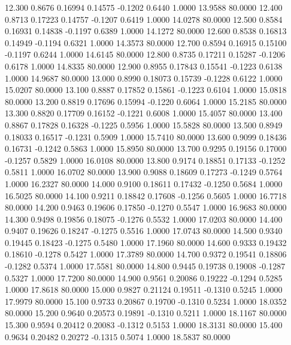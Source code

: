   12.300   0.8676   0.16994   0.14575  -0.1202   0.6440   1.0000  13.9588  80.0000
  12.400   0.8713   0.17223   0.14757  -0.1207   0.6419   1.0000  14.0278  80.0000
  12.500   0.8584   0.16931   0.14838  -0.1197   0.6389   1.0000  14.1272  80.0000
  12.600   0.8538   0.16813   0.14949  -0.1194   0.6321   1.0000  14.3573  80.0000
  12.700   0.8594   0.16915   0.15100  -0.1197   0.6244   1.0000  14.6145  80.0000
  12.800   0.8735   0.17211   0.15287  -0.1206   0.6178   1.0000  14.8335  80.0000
  12.900   0.8955   0.17843   0.15541  -0.1223   0.6138   1.0000  14.9687  80.0000
  13.000   0.8990   0.18073   0.15739  -0.1228   0.6122   1.0000  15.0207  80.0000
  13.100   0.8887   0.17852   0.15861  -0.1223   0.6104   1.0000  15.0818  80.0000
  13.200   0.8819   0.17696   0.15994  -0.1220   0.6064   1.0000  15.2185  80.0000
  13.300   0.8820   0.17709   0.16152  -0.1221   0.6008   1.0000  15.4057  80.0000
  13.400   0.8867   0.17828   0.16328  -0.1225   0.5956   1.0000  15.5828  80.0000
  13.500   0.8949   0.18033   0.16517  -0.1231   0.5909   1.0000  15.7410  80.0000
  13.600   0.9099   0.18436   0.16731  -0.1242   0.5863   1.0000  15.8950  80.0000
  13.700   0.9295   0.19156   0.17000  -0.1257   0.5829   1.0000  16.0108  80.0000
  13.800   0.9174   0.18851   0.17133  -0.1252   0.5811   1.0000  16.0702  80.0000
  13.900   0.9088   0.18609   0.17273  -0.1249   0.5764   1.0000  16.2327  80.0000
  14.000   0.9100   0.18611   0.17432  -0.1250   0.5684   1.0000  16.5025  80.0000
  14.100   0.9211   0.18842   0.17608  -0.1256   0.5605   1.0000  16.7718  80.0000
  14.200   0.9463   0.19606   0.17850  -0.1270   0.5547   1.0000  16.9683  80.0000
  14.300   0.9498   0.19856   0.18075  -0.1276   0.5532   1.0000  17.0203  80.0000
  14.400   0.9407   0.19626   0.18247  -0.1275   0.5516   1.0000  17.0743  80.0000
  14.500   0.9340   0.19445   0.18423  -0.1275   0.5480   1.0000  17.1960  80.0000
  14.600   0.9333   0.19432   0.18610  -0.1278   0.5427   1.0000  17.3789  80.0000
  14.700   0.9372   0.19541   0.18806  -0.1282   0.5374   1.0000  17.5581  80.0000
  14.800   0.9445   0.19738   0.19008  -0.1287   0.5327   1.0000  17.7200  80.0000
  14.900   0.9561   0.20086   0.19222  -0.1294   0.5285   1.0000  17.8618  80.0000
  15.000   0.9827   0.21124   0.19511  -0.1310   0.5245   1.0000  17.9979  80.0000
  15.100   0.9733   0.20867   0.19700  -0.1310   0.5234   1.0000  18.0352  80.0000
  15.200   0.9640   0.20573   0.19891  -0.1310   0.5211   1.0000  18.1167  80.0000
  15.300   0.9594   0.20412   0.20083  -0.1312   0.5153   1.0000  18.3131  80.0000
  15.400   0.9634   0.20482   0.20272  -0.1315   0.5074   1.0000  18.5837  80.0000
